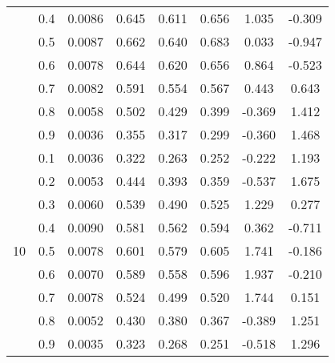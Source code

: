 \documentclass[11pt,a4paper]{report}
\begin{document}
\begin{longtable}{ | c | c || c | c | c | c | c | c | }
 & 0.4 & 0.0086 & 0.645 & 0.611 & 0.656 & 1.035 & -0.309 \\
 & 0.5 & 0.0087 & 0.662 & 0.640 & 0.683 & 0.033 & -0.947 \\
 & 0.6 & 0.0078 & 0.644 & 0.620 & 0.656 & 0.864 & -0.523 \\
 & 0.7 & 0.0082 & 0.591 & 0.554 & 0.567 & 0.443 & 0.643 \\
 & 0.8 & 0.0058 & 0.502 & 0.429 & 0.399 & -0.369 & 1.412 \\
 & 0.9 & 0.0036 & 0.355 & 0.317 & 0.299 & -0.360 & 1.468 \\
 \hline
\multirow{9}{*}{10} & 0.1 & 0.0036 & 0.322 & 0.263 & 0.252 & -0.222 & 1.193 \\
 & 0.2 & 0.0053 & 0.444 & 0.393 & 0.359 & -0.537 & 1.675 \\
 & 0.3 & 0.0060 & 0.539 & 0.490 & 0.525 & 1.229 & 0.277 \\
 & 0.4 & 0.0090 & 0.581 & 0.562 & 0.594 & 0.362 & -0.711 \\
 & 0.5 & 0.0078 & 0.601 & 0.579 & 0.605 & 1.741 & -0.186 \\
 & 0.6 & 0.0070 & 0.589 & 0.558 & 0.596 & 1.937 & -0.210 \\
 & 0.7 & 0.0078 & 0.524 & 0.499 & 0.520 & 1.744 & 0.151 \\
 & 0.8 & 0.0052 & 0.430 & 0.380 & 0.367 & -0.389 & 1.251 \\
 & 0.9 & 0.0035 & 0.323 & 0.268 & 0.251 & -0.518 & 1.296 \\
 \hline
\hline
\end{longtable}
\end{document}
